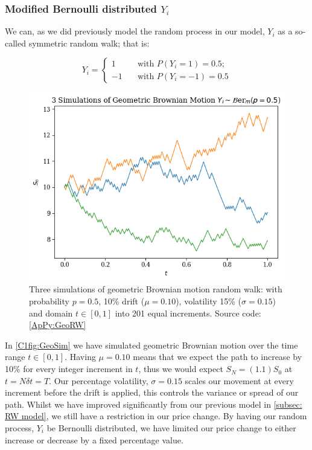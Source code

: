 \subsubsection{Modified Bernoulli  distributed \(Y_i\)}

We can, as we did previously model the random process in our model, \(Y_i\) as a so-called symmetric random walk; that is:

\begin{equation*}
    Y_i = 
    \begin{cases}
       1& \quad \text{with } P(Y_i = 1) = 0.5; \\
       -1& \quad \text{with } P(Y_i = -1) = 0.5
    \end{cases}
\end{equation*}

\begin{figure}[H]
    \centering
    \includegraphics[width=\sOneSize\textwidth]{Chapters/C1/plots/BM_Simulations.png}
    \caption{Three simulations of geometric Brownian motion random walk: with probability \(p = 0.5\), 10\% drift (\(\mu = 0.10\)), volatility 15\% (\(\sigma = 0.15\)) and domain \(t\in[0,1]\) into 201 equal increments. Source code: \autoref{ApPy:GeoRW}}\label{C1fig:GeoSim}
\end{figure}

In \autoref{C1fig:GeoSim} we have simulated geometric Brownian motion over the time range \(t \in [0,1]\). Having \(\mu = 0.10\) means that we expect the path to increase by 10\% for every integer increment in \(t\), thus we would expect \(S_N = (1.1)S_0\) at \( t = N\delta t = T\). Our percentage volatility, \(\sigma = 0.15\) scales our movement at every increment before the drift is applied, this controls the variance or spread of our path. Whilst we have improved significantly from our previous model in \autoref{subsec: RW model}, we still have a restriction in our price change. By having our random process, \(Y_i\) be Bernoulli distributed, we have limited our price change to either increase or decrease by a fixed percentage value.

